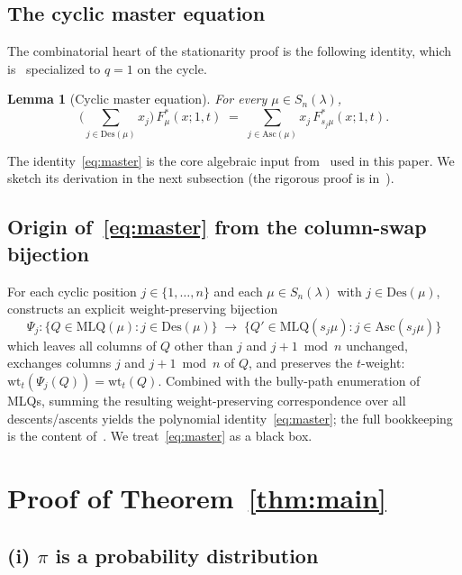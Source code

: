 \documentclass[12pt]{article}
\newtheorem{lemma}[theorem]{Lemma}
\theoremstyle{definition}
\begin{document}
\subsection{The cyclic master equation}

The combinatorial heart of the stationarity proof is the following
identity, which is~\cite[Theorem~5.4]{CMW} specialized to $q=1$ on the
cycle.

\begin{lemma}[Cyclic master equation]\label{lem:master}
For every $\mu\in S_n(\lambda)$,
\begin{equation}\label{eq:master}
\Biggl(\sum_{j\in\mathrm{Des}(\mu)}\!x_j\Biggr)\,F^*_\mu(x;1,t)
\;=\;\sum_{j\in\mathrm{Asc}(\mu)}\!x_j\,F^*_{s_j\mu}(x;1,t).
\end{equation}
\end{lemma}

\noindent The identity~\eqref{eq:master} is the core algebraic input
from~\cite{CMW} used in this paper. We sketch its derivation in the next
subsection (the rigorous proof is in~\cite{CMW}).

\subsection{Origin of~\eqref{eq:master} from the column-swap bijection}\label{sec:bijective}

For each cyclic position $j\in\{1,\dots,n\}$ and each $\mu\in S_n(\lambda)$
with $j\in\mathrm{Des}(\mu)$, \cite[Proposition~5.2]{CMW} constructs an
explicit weight-preserving bijection
\[
\Psi_j:\bigl\{Q\in\mathrm{MLQ}(\mu):j\in\mathrm{Des}(\mu)\bigr\}
\;\longrightarrow\;\bigl\{Q'\in\mathrm{MLQ}(s_j\mu):j\in\mathrm{Asc}(s_j\mu)\bigr\}
\]
which leaves all columns of $Q$ other than $j$ and $j+1\bmod n$
unchanged, exchanges columns $j$ and $j+1\bmod n$ of $Q$, and preserves
the $t$-weight: $\mathrm{wt}_t(\Psi_j(Q))=\mathrm{wt}_t(Q)$. Combined
with the bully-path enumeration of MLQs, summing the resulting
weight-preserving correspondence over all descents/ascents yields the
polynomial identity~\eqref{eq:master}; the full bookkeeping is the
content of~\cite[Theorem~5.4]{CMW}. We treat~\eqref{eq:master} as a
black box.

\section{Proof of Theorem~\ref{thm:main}}\label{sec:proof}

\subsection{(i) $\pi$ is a probability distribution}
\end{document}
